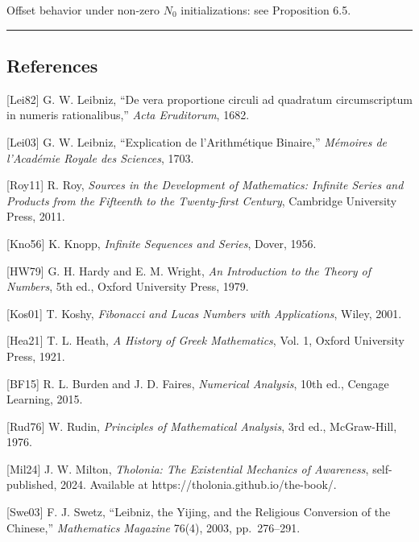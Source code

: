 \documentclass[
  11pt,
  letterpaper,
]{article}
\begin{document}
Offset behavior under non-zero \(N_0\) initializations: see Proposition
6.5.

\begin{center}\rule{0.5\linewidth}{0.5pt}\end{center}

\subsection{References}\label{references}

{[}Lei82{]} G. W. Leibniz, ``De vera proportione circuli ad quadratum
circumscriptum in numeris rationalibus,'' \emph{Acta Eruditorum}, 1682.

{[}Lei03{]} G. W. Leibniz, ``Explication de l'Arithmétique Binaire,''
\emph{Mémoires de l'Académie Royale des Sciences}, 1703.

{[}Roy11{]} R. Roy, \emph{Sources in the Development of Mathematics:
Infinite Series and Products from the Fifteenth to the Twenty-first
Century}, Cambridge University Press, 2011.

{[}Kno56{]} K. Knopp, \emph{Infinite Sequences and Series}, Dover, 1956.

{[}HW79{]} G. H. Hardy and E. M. Wright, \emph{An Introduction to the
Theory of Numbers}, 5th ed., Oxford University Press, 1979.

{[}Kos01{]} T. Koshy, \emph{Fibonacci and Lucas Numbers with
Applications}, Wiley, 2001.

{[}Hea21{]} T. L. Heath, \emph{A History of Greek Mathematics}, Vol. 1,
Oxford University Press, 1921.

{[}BF15{]} R. L. Burden and J. D. Faires, \emph{Numerical Analysis},
10th ed., Cengage Learning, 2015.

{[}Rud76{]} W. Rudin, \emph{Principles of Mathematical Analysis}, 3rd
ed., McGraw-Hill, 1976.

{[}Mil24{]} J. W. Milton, \emph{Tholonia: The Existential Mechanics of
Awareness}, self-published, 2024. Available at
https://tholonia.github.io/the-book/.

{[}Swe03{]} F. J. Swetz, ``Leibniz, the Yijing, and the Religious
Conversion of the Chinese,'' \emph{Mathematics Magazine} 76(4), 2003,
pp.~276--291.
\end{document}
